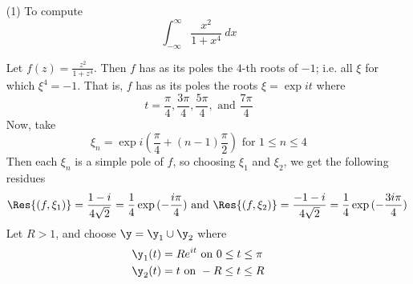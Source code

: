 \begin{example}\label{example_5.2}
    \begin{enumerate}
    \item[(1)] To compute
        \begin{equation*}
            \int_{-\infty}^\infty{\frac{x^2}{1+x^4} \ dx}
        \end{equation*}

        Let $f(z)=\frac{z^2}{1+z^4}$. Then $f$ has as its poles the $4$-th roots
        of  $-1$; i.e. all $\xi$ for which $\xi^4=-1$. That is,  $f$ has as its
        poles the roots  $\xi=\exp{it}$ where
        \begin{equation*}
            t=\frac{\pi}{4}, \frac{3\pi}{4}, \frac{5\pi}{4}, \text{ and } \frac{7\pi}{4}
        \end{equation*}
        Now, take
        \begin{equation*}
            \xi_n=\exp{i(\frac{\pi}{4}+(n-1)\frac{\pi}{2})} \text{ for } 1 \leq
            n \leq 4
        \end{equation*}
        Then each $\xi_n$ is a simple pole of  $f$, so choosing $\xi_1$ and
        $\xi_2$, we get the following residues
        \begin{equation*}
            \Res{(f,\xi_1)}=\frac{1-i}{4\sqrt{2}}=\frac{1}{4}\exp{(-\frac{i\pi}{4})}
            \text{ and }
            \Res{(f,\xi_2)}=\frac{-1-i}{4\sqrt{2}}=\frac{1}{4}\exp{(-\frac{3i\pi}{4})}
        \end{equation*}
        Let $R>1$, and choose  $\y=\y_1 \cup \y_2$ where
        \begin{align*}
            \y_1(t) &=  Re^{it} \text{ on } 0 \leq t \leq \pi  \\
            \y_2(t) &=  t   \text{ on } -R \leq t \leq R    \\
        \end{align*}


\end{enumerate}
\end{example}
